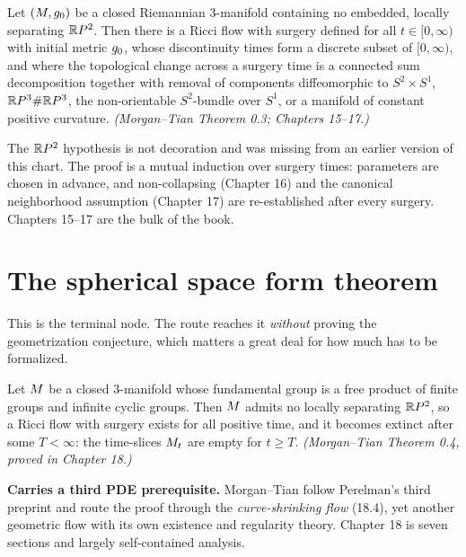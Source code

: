 \begin{theorem}
  \label{thm:surgery-exists}
  Let $(M, g_0)$ be a closed Riemannian $3$-manifold containing no embedded,
  locally separating $\mathbb{R} P^2$. Then there is a Ricci flow with surgery defined
  for all $t \in [0,\infty)$ with initial metric $g_0$, whose discontinuity
  times form a discrete subset of $[0,\infty)$, and where the topological change
  across a surgery time is a connected sum decomposition together with removal
  of components diffeomorphic to $S^2 \times S^1$, $\mathbb{R} P^3 \# \mathbb{R} P^3$, the
  non-orientable $S^2$-bundle over $S^1$, or a manifold of constant positive
  curvature. \emph{(Morgan--Tian Theorem 0.3; Chapters 15--17.)}

  The $\mathbb{R} P^2$ hypothesis is not decoration and was missing from an earlier
  version of this chart. The proof is a mutual induction over surgery times:
  parameters are chosen in advance, and non-collapsing (Chapter 16) and the
  canonical neighborhood assumption (Chapter 17) are re-established after every
  surgery. Chapters 15--17 are the bulk of the book.
\end{theorem}

\chapter{The spherical space form theorem}
\label{chap:spaceform}

This is the terminal node. The route reaches it \emph{without} proving the
geometrization conjecture, which matters a great deal for how much has to be
formalized.

\begin{theorem}
  \label{thm:finite-extinction}
  Let $M$ be a closed $3$-manifold whose fundamental group is a free product of
  finite groups and infinite cyclic groups. Then $M$ admits no locally
  separating $\mathbb{R} P^2$, so a Ricci flow with surgery exists for all positive time,
  and it becomes extinct after some $T < \infty$: the time-slices $M_t$ are
  empty for $t \ge T$. \emph{(Morgan--Tian Theorem 0.4, proved in Chapter 18.)}

  \textbf{Carries a third PDE prerequisite.} Morgan--Tian follow Perelman's
  third preprint and route the proof through the \emph{curve-shrinking flow}
  (18.4), yet another geometric flow with its own existence and regularity
  theory. Chapter 18 is seven sections and largely self-contained analysis.
\end{theorem}

